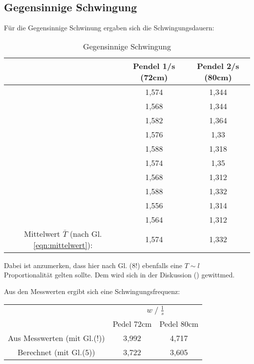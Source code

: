 \subsection{Gegensinnige Schwingung}
Für die Gegensinnige Schwinung ergaben sich die Schwingungsdauern:
\begin{table}
    \centering
    \label{tab:Data_gegenphasig}
    \begin{tabular}{c c | c}
        \toprule
        & Pendel 1\;/\;s (72cm) & Pendel 2\;/\;s (80cm)\\
        \midrule
        & 1,574 & 1,344 \\
        & 1,568 & 1,344 \\
        & 1,582 & 1,364 \\
        & 1,576 & 1,33  \\
        & 1,588 & 1,318 \\
        & 1,574 & 1,35  \\
        & 1,568 & 1,312 \\
        & 1,588 & 1,332 \\
        & 1,556 & 1,314 \\
        & 1,564 & 1,312 \\
        \midrule
        Mittelwert $\bar{T}$ (nach Gl. \ref{eqn:mittelwert}): & 1,574 & 1,332 \\
        \bottomrule
    \end{tabular}
    \caption{Gegensinnige Schwingung}
\end{table}
Dabei ist anzumerken, dass hier nach Gl. (8!) ebenfalls eine $T \sim l$ Proportionalität
gelten sollte. Dem wird sich in der Diskussion () gewittmed.\newline

Aus den Messwerten ergibt sich eine Schwingungsfrequenz:
\begin{table}
    \centering
    \label{tab:frq_gegens}
    \begin{tabular}{c c c}
        \toprule
        & \multicolumn{2}{c}{$w\;/\;\frac{1}{s}$}\\
        \cmidrule(lr){2-3} 
        & Pedel 72cm & Pedel 80cm\\
        \midrule
        Aus Messwerten (mit Gl.(!)) & 3,992 & 4,717 \\
        Berechnet (mit Gl.(5))      & 3,722 & 3,605 \\
        \bottomrule
    \end{tabular}
\end{table}
\newpage
